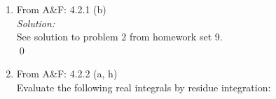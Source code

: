 \documentclass[10pt]{amsart}
\newcommand{\I}{\mathrm{i}}
\DeclareMathOperator{\E}{e}
\theoremstyle{nonumberplain}
\begin{document}
\begin{enumerate}[label={\bf {\arabic*}:}]
\begin{align*}
	&= \frac 1 \I \Bigg( \frac {\E^{\I N z}}{\E^{\I N z}} \left( \frac { 1 + \E^{- 2 \I N z} }{ 1 - \E^{- 2 \I N z} } \right) \Bigg) \\
	&= \frac 1 \I \Bigg( \frac { 1 + \E^{- 2 \I N z} }{ 1 - \E^{- 2 \I N z} } \Bigg) \\
	&= \frac 1 \I \Bigg( \frac { 1 + \left( \cos (N z) - \I \sin(N z) \right)^2 }{ 1 - \left( \cos (N z) - \I \sin(N z) \right)^2 } \Bigg) \\
	&= \frac 1 \I \Bigg( \frac { 1 +  \cos^2 (N z) - 2 \I \cos(N z) \sin(N z)- \sin^2(N z) }{ 1 - \cos^2 (N z) + 2 \I \cos(N z) \sin(N z) + \sin^2(N z) } \Bigg) \\
	&... \\
	&= \I + \mathcal O(\E^{-2Nh})
\end{align*}
\newpage

\item From A\&F: 4.2.1 (b) \\
 
\noindent
\textit{Solution:} \\
See solution to problem 2 from homework set 9. \\
\qed \\


\item From A\&F: 4.2.2 (a, h) \\
Evaluate the following real integrals by residue integration: \\
 

\end{enumerate}
\end{document}
